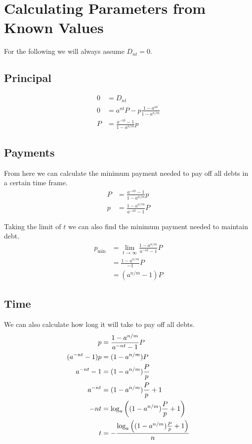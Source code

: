\documentclass[12pt]{article}
\begin{document}
\section{Calculating Parameters from Known Values}

For the following we will always assume $D_{nt} = 0$.

\subsection{Principal}

\begin{align*}
    0 &= D_{nt}\\
    0 &= a^{nt} P - p \frac{1 - a^{nt}}{1 - a^{n/m}}\\
    P &= \frac{a^{-nt} - 1}{1 - a^{n/m}} p
\end{align*}


\subsection{Payments}

From here we can calculate the minimum payment needed to pay off all debts in
a certain time frame.
\begin{align*}
    P &= \frac{a^{-nt} - 1}{1 - a^{n/m}} p\\
    p &= \frac{1 - a^{n/m}}{a^{-nt} - 1} P
\end{align*}

Taking the limit of $t$ we can also find the minimum payment needed to maintain
debt.
\begin{align*}
    p_\text{min} &= \lim_{t \to \infty} \frac{1 - a^{n/m}}{a^{-nt} - 1} P\\
                 &= \frac{1 - a^{n/m}}{-1} P\\
                 &= (a^{n/m} - 1) P
\end{align*}


\subsection{Time}

We can also calculate how long it will take to pay off all debts.
\begin{align*}
    p &= \frac{1 - a^{n/m}}{a^{-nt} - 1} P\\
    (a^{-nt} - 1) p &= (1 - a^{n/m}) P\\
    a^{-nt} - 1 &= (1 - a^{n/m}) \frac{P}{p}\\
    a^{-nt} &= (1 - a^{n/m}) \frac{P}{p} + 1\\
    -nt &= \log_a\del{(1 - a^{n/m}) \frac{P}{p} + 1}\\
    t &= -\frac{\log_a\del{(1 - a^{n/m}) \frac{P}{p} + 1}}{n}\\
\end{align*}
\end{document}
